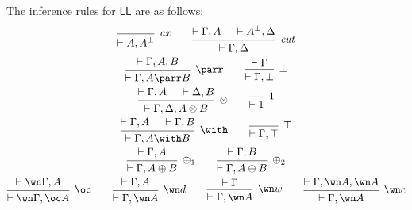 \documentclass[11pt]{article}
\newcommand\LL{\textsf{LL}}
\newcommand\0{\textbf{0}}
\newcommand\1{\textbf{1}}
\begin{document}
The inference rules for $\LL$ are as follows:
\begin{gather*}
    \begin{prooftree}
        \infer0[\textit{ax}]{\vdash A, A^\perp}
    \end{prooftree}
    \qquad
    \begin{prooftree}
        \hypo{\vdash \Gamma, A}
        \hypo{\vdash A^\perp, \Delta}
        \infer2[\textit{cut}]{\vdash \Gamma, \Delta}
    \end{prooftree}
    \\
    \begin{prooftree}
        \hypo{\vdash \Gamma, A, B}
        \infer1[$\parr$]{\vdash \Gamma, A \parr B}
    \end{prooftree}
    \qquad
    \begin{prooftree}
        \hypo{\vdash \Gamma}
        \infer1[$\bot$]{\vdash \Gamma, \bot}
    \end{prooftree}
    \\
    \begin{prooftree}
        \hypo{\vdash \Gamma, A}
        \hypo{\vdash \Delta, B}
        \infer2[$\otimes$]{\vdash \Gamma, \Delta, A \otimes B}
    \end{prooftree}
    \qquad
    \begin{prooftree}
        \infer0[$1$]{\vdash 1}
    \end{prooftree}
    \\
    \begin{prooftree}
        \hypo{\vdash \Gamma, A}
        \hypo{\vdash \Gamma, B}
        \infer2[$\with$]{\vdash \Gamma, A \with B}
    \end{prooftree}
    \qquad
    \begin{prooftree}
        \infer0[$\top$]{\vdash \Gamma, \top}
    \end{prooftree}
    \\
    \begin{prooftree}
        \hypo{\vdash \Gamma, A}
        \infer1[$\oplus_1$]{\vdash \Gamma, A \oplus B}
    \end{prooftree}
    \qquad
    \begin{prooftree}
        \hypo{\vdash \Gamma, B}
        \infer1[$\oplus_2$]{\vdash \Gamma, A \oplus B}
    \end{prooftree}
    \\
    \begin{prooftree}
        \hypo{\vdash \wn\Gamma, A}
        \infer1[$\oc$]{\vdash \wn\Gamma, \oc A}
    \end{prooftree}
    \qquad
    \begin{prooftree}
        \hypo{\vdash \Gamma, A}
        \infer1[$\wn d$]{\vdash \Gamma, \wn A}
    \end{prooftree}
    \qquad
    \begin{prooftree}
        \hypo{\vdash \Gamma}
        \infer1[$\wn w$]{\vdash \Gamma, \wn A}
    \end{prooftree}
    \qquad
    \begin{prooftree}
        \hypo{\vdash \Gamma, \wn A, \wn A}
        \infer1[$\wn c$]{\vdash \Gamma, \wn A}
    \end{prooftree}
\end{gather*}
\end{document}
